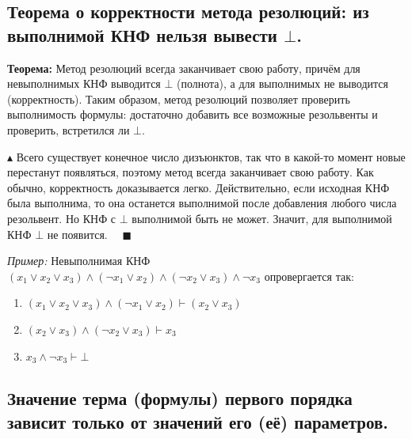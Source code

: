 \subsection{Теорема о корректности метода резолюций: из выполнимой КНФ нельзя вывести $\bot$.}
\textbf{Теорема:} Метод резолюций всегда заканчивает свою работу, причём для невыполнимых КНФ выводится $\bot$ (полнота), а для выполнимых не выводится (корректность). Таким образом, метод резолюций позволяет проверить выполнимость формулы: достаточно добавить все возможные резольвенты и проверить, встретился ли $\bot$.

$\blacktriangle$ Всего существует конечное число дизъюнктов, так что в какой-то момент новые перестанут появляться, поэтому метод всегда заканчивает свою работу. Как обычно, корректность доказывается легко. Действительно, если исходная КНФ была выполнима, то она останется выполнимой после добавления любого числа резольвент. Но КНФ с $\bot$ выполнимой быть не может. Значит, для выполнимой КНФ $\bot$ не появится. $\quad \blacksquare$


\textit{Пример:} Невыполнимая КНФ $(x_1 \lor x_2 \lor x_3) \land (\neg x_1 \lor x_2) \land (\neg x_2 \lor x_3) \land \neg x_3$ опровергается так:
\begin{enumerate}
    \item $(x_1 \lor x_2 \lor x_3) \land (\neg x_1 \lor x_2) \vdash (x_2 \lor x_3)$
    \item $(x_2 \lor x_3) \land (\neg x_2 \lor x_3) \vdash x_3$
    \item $x_3 \land \neg x_3 \vdash \bot$
\end{enumerate}

\subsection{Значение терма (формулы) первого порядка зависит только от значений его (её) параметров.}

